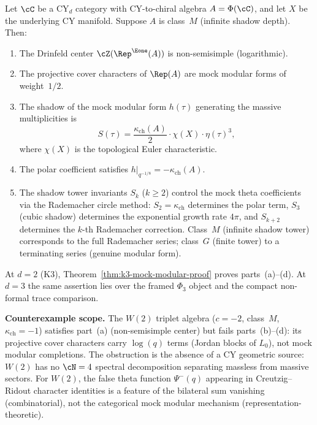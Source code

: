 \begin{conjecture}
\label{conj:cy-mock-modular-mechanism}
\ClaimStatusConjectured
Let $\cC$ be a CY$_d$ category with CY-to-chiral algebra $A = \Phi(\cC)$, and let $X$ be the underlying CY manifold. Suppose $A$ is class~$M$ (infinite shadow depth). Then:
\begin{enumerate}[label=\textup{(\alph*)}]
\item The Drinfeld center $\cZ(\Rep^{\Eone}(A))$ is non-semisimple (logarithmic).
\item The projective cover characters of $\Rep(A)$ are mock modular forms of weight~$1/2$.
\item The shadow of the mock modular form $h(\tau)$ generating the massive multiplicities is
\begin{equation}\label{eq:cy-mock-shadow-formula}
S(\tau) = \frac{\kappa_{\mathrm{ch}}(A)}{2} \cdot \chi(X) \cdot \eta(\tau)^3,
\end{equation}
where $\chi(X)$ is the topological Euler characteristic.
\item The polar coefficient satisfies $h|_{q^{-1/8}} = -\kappa_{\mathrm{ch}}(A)$.
\item The shadow tower invariants $S_k$ ($k \geq 2$) control the mock theta coefficients via the Rademacher circle method: $S_2 = \kappa_{\mathrm{ch}}$ determines the polar term, $S_3$ (cubic shadow) determines the exponential growth rate $4\pi$, and $S_{k+2}$ determines the $k$-th Rademacher correction. Class~$M$ (infinite shadow tower) corresponds to the full Rademacher series; class~$G$ (finite tower) to a terminating series (genuine modular form).
\end{enumerate}
At $d = 2$ (K3), Theorem~\ref{thm:k3-mock-modular-proof} proves
parts~(a)--(d). At $d = 3$ the same assertion lies over the framed
$\Phi_3$ object and the compact non-formal trace comparison.

\medskip\noindent
\textbf{Counterexample scope.} The $W(2)$ triplet algebra ($c = -2$, class~$M$, $\kappa_{\mathrm{ch}} = -1$) satisfies part~(a) (non-semisimple center) but fails parts~(b)--(d): its projective cover characters carry $\log(q)$ terms (Jordan blocks of $L_0$), not mock modular completions. The obstruction is the absence of a CY geometric source: $W(2)$ has no $\cN = 4$ spectral decomposition separating massless from massive sectors. For $W(2)$, the false theta function $\Psi^{-}(q)$ appearing in Creutzig--Ridout character identities is a feature of the bilateral sum vanishing (combinatorial), not the categorical mock modular mechanism (representation-theoretic).
\end{conjecture}

